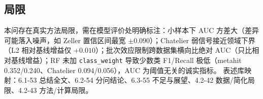 \documentclass{internal-report}
\begin{document}
\subsection{局限}
本问存在真实方法局限，需在模型评价处明确标注：小样本下 AUC 方差大（差异可能落入噪声，如 Zeller 置信区间最宽 $\pm0.090$）；Chatelier 弱信号接近领域下界（L2 相对基线增益仅 $+0.010$）；批次效应限制跨数据集横向比绝对 AUC（只比相对基线增益）；RF 未加 \texttt{class\_weight} 导致少数类 F1/Recall 极低（metahit 0.352/0.240、Chatelier 0.094/0.056），AUC 为阈值无关的诚实指标。
表述库映射：6.1-53 总结全文、6.2-54 分问结论、6.3-55 不足与展望、4.2-42 数据/简化局限、4.2-43 方法/计算局限。

\end{document}
